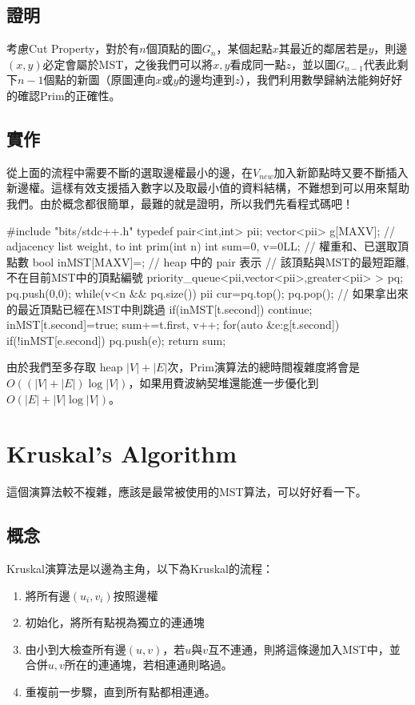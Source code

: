 \documentclass[main.tex]{subfiles}
\begin{document}
\subsection{證明}
考慮Cut Property，對於有$n$個頂點的圖$G_n$，某個起點$x$其最近的鄰居若是$y$，則邊$(x,y)$必定會屬於MST，之後我們可以將$x,y$看成同一點$z$，並以圖$G_{n-1}$代表此剩下$n-1$個點的新圖（原圖連向$x$或$y$的邊均連到$z$），我們利用數學歸納法能夠好好的確認Prim的正確性。
\subsection{實作}
從上面的流程中需要不斷的選取邊權最小的邊，在$V_{new}$加入新節點時又要不斷插入新邊權。這樣有效支援插入數字以及取最小值的資料結構，不難想到可以用來幫助我們。由於概念都很簡單，最難的就是證明，所以我們先看程式碼吧！

\begin{C++}
#include "bits/stdc++.h"
typedef pair<int,int> pii;
vector<pii> g[MAXV]; // adjacency list {weight, to}
int prim(int n){
    int sum=0, v=0LL; // 權重和、已選取頂點數
    bool inMST[MAXV]={};
    // heap 中的 pair 表示
    // {該頂點與MST的最短距離, 不在目前MST中的頂點編號}
    priority_queue<pii,vector<pii>,greater<pii> > pq;
    pq.push({0,0});
    while(v<n && pq.size()){
        pii cur=pq.top(); pq.pop();
        // 如果拿出來的最近頂點已經在MST中則跳過
        if(inMST[t.second]) continue;
        inMST[t.second]=true;
        sum+=t.first, v++;
        for(auto &e:g[t.second]) {
        	if(!inMST[e.second]) pq.push(e);
        }
    }
    return sum;
}
\end{C++}
由於我們至多存取 heap $|V|+|E|$次，Prim演算法的總時間複雜度將會是$O((|V|+|E|)\log|V|)$，如果用費波納契堆還能進一步優化到$O(|E|+|V|\log|V|)$。
\section{Kruskal's Algorithm}
這個演算法較不複雜，應該是最常被使用的MST算法，可以好好看一下。
\subsection{概念}
Kruskal演算法是以邊為主角，以下為Kruskal的流程：
\begin{enumerate}
\item 將所有邊$(u_i,v_i)$按照邊權
\item 初始化，將所有點視為獨立的連通塊
\item 由小到大檢查所有邊$(u,v)$，若$u$與$v$互不連通，則將這條邊加入MST中，並合併$u,v$所在的連通塊，若相連通則略過。
\item 重複前一步驟，直到所有點都相連通。
\end{enumerate}
\end{document}
